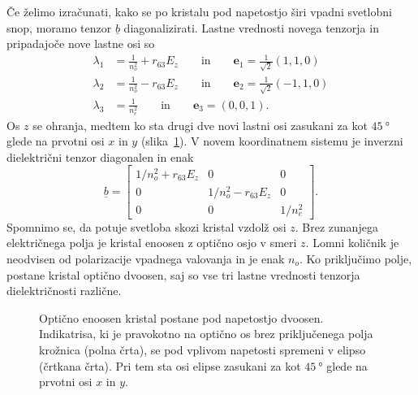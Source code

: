 Če želimo izračunati, kako se po kristalu pod napetostjo širi vpadni svetlobni
snop, moramo tenzor $\underline{b}$ diagonalizirati. Lastne vrednosti novega tenzorja
in pripadajoče nove lastne osi so
\begin{align}
\lambda_1 &= \frac{1}{n_o^2}+ r_{63}E_z \qquad \mathrm{in} \qquad \mathbf{e}_1 = \frac{1}{\sqrt{2}}(1,1,0)\\
\lambda_2 &= \frac{1}{n_o^2}- r_{63}E_z \qquad \mathrm{in} \qquad \mathbf{e}_2 = \frac{1}{\sqrt{2}}(-1,1,0)\\
\lambda_3 &= \frac{1}{n_e^2} \qquad \mathrm{in} \qquad \mathbf{e}_3 = (0,0,1).
\end{align}
Os $z$ se ohranja, medtem ko sta drugi dve novi lastni osi zasukani za kot $45~\si{\degree}$ 
glede na prvotni osi $x$ in $y$ (slika~\ref{fig:amn}).
V novem koordinatnem sistemu je inverzni dielektrični tenzor diagonalen in enak
\begin{equation}
\underline{b} = 
\left[\begin{array}{ccc}
1/n_o^2 + r_{63}E_z& 0& 0\\
0 & 1/n_o^2 - r_{63}E_z& 0\\
0 & 0& 1/n_e^2
\end{array}\right].
\end{equation}
Spomnimo se, da potuje svetloba skozi kristal vzdolž osi $z$. Brez zunanjega električnega
polja je kristal enoosen z optično osjo v smeri $z$. 
Lomni količnik je neodvisen od
polarizacije vpadnega valovanja in je enak $n_o$. Ko priključimo polje, postane kristal
optično dvoosen, saj so vse tri lastne vrednosti tenzorja dielektričnosti različne. 
\begin{figure}[h]
\centering
\def\svgwidth{60truemm} 

\caption{Optično enoosen kristal postane pod napetostjo dvoosen. Indikatrisa, ki je pravokotno
na optično os brez priključenega polja krožnica (polna črta), se pod vplivom 
napetosti spremeni v elipso (črtkana črta). Pri tem sta osi elipse zasukani za kot 
$45~\si{\degree}$ glede na prvotni osi $x$ in $y$.}
\label{fig:amn}
\end{figure}

